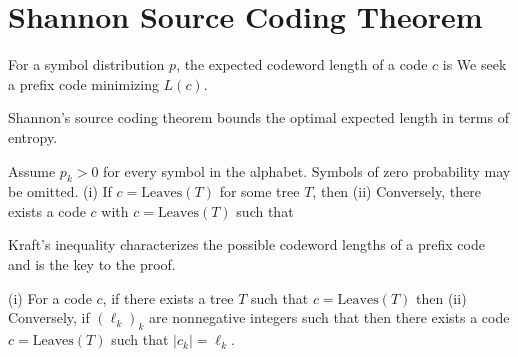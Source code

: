 \section{Shannon Source Coding Theorem}

For a symbol distribution $p$, the expected codeword length of a code $c$ is
We seek a prefix code minimizing $L(c)$.
 
Shannon's source coding theorem bounds the optimal expected length in terms of entropy.

\begin{thm}\label{thm-shannon-source-coding}
Assume $p_k>0$ for every symbol in the alphabet. Symbols of zero probability may be omitted.
	(i) If $c=\text{Leaves}(T)$ for some tree $T$, then 
	(ii) Conversely, there exists a code $c$ with $c=\text{Leaves}(T)$ such that 
\end{thm} 

Kraft's inequality characterizes the possible codeword lengths of a prefix code and is the key to the proof.

\begin{lem}\label{lem-kraft}
	(i) For a code $c$, if there exists a tree $T$ such that $c=\text{Leaves}(T)$ then
	(ii) Conversely, if $(\ell_k)_k$ are nonnegative integers such that
	then there exists a code $c=\text{Leaves}(T)$ such that $|c_k|=\ell_k$.
\end{lem} 

